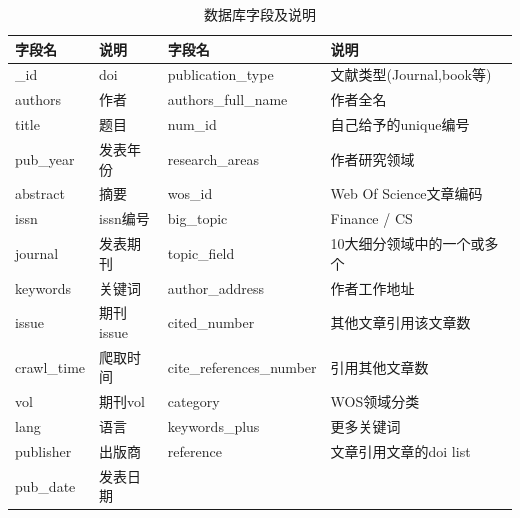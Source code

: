 \documentclass{bmvc2k}
\begin{document}
\begin{table}
	\begin{center}
		\begin{tabular}{| l |l| l |p{3cm} |} 
			\hline 
			字段名 & 说明  & 字段名 & 说明 \\ 
			\hline\hline
			\_id & doi & publication\_type  & 文献类型(Journal,book等) \\ 
			\hline 
			authors & 作者 & authors\_full\_name & 作者全名 \\ 
			\hline 
			title & 题目 & num\_id & 自己给予的unique编号  \\ 
			\hline 
			pub\_year & 发表年份 & research\_areas & 作者研究领域 \\ 
			\hline 
			abstract & 摘要  & wos\_id & Web Of Science文章编码 \\ 
			\hline 
			issn & issn编号 & big\_topic & Finance / CS \\ 
			\hline 
			journal & 发表期刊 & topic\_field & 10大细分领域中的一个或多个 \\ 
			\hline 
			keywords & 关键词 & author\_address & 作者工作地址   \\ 
			\hline 
			issue & 期刊issue & cited\_number & 其他文章引用该文章数 \\ 
			\hline 
			crawl\_time & 爬取时间 & cite\_references\_number & 引用其他文章数 \\ 
			\hline 
			vol & 期刊vol & category & WOS领域分类 \\ 
			\hline 
			lang & 语言 & keywords\_plus & 更多关键词   \\ 
			\hline 
			publisher & 出版商 & reference & 文章引用文章的doi list \\
			\hline 
			pub\_date & 发表日期 & &    \\
			\hline 
		\end{tabular} 
	\end{center}
	\caption{数据库字段及说明}
\end{table}



\end{document}
